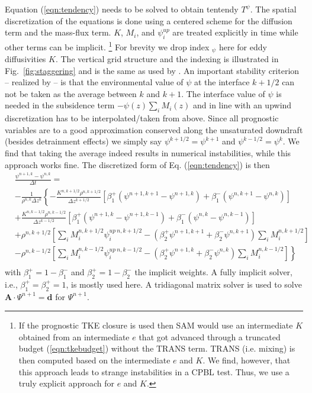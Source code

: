 \documentclass[dvipdfmx,a4paper,10pt]{article}
\begin{document}
Equation (\ref{eqn:tendency}) needs to be solved to obtain tentendy $T^{\psi}$. The spatial discretization of the equations is done using a centered scheme for the diffusion term and the mass-flux term. $K$, $M_i$, and $\psi^{up}_i$ are treated explicitly in time while other terms can be implicit. \footnote{If the prognostic TKE closure is used then SAM would use an intermediate $K$ obtained from an intermediate $e$ that got advanced through a truncated budget (\ref{eqn:tkebudget}) without the TRANS term. TRANS (i.e. mixing) is then computed based on the intermediate $e$ and $K$. We find, however, that this approach leads to strange instabilities in a CPBL test. Thus, we use a truly explicit approach for $e$ and $K$.} For brevity we drop index $_\psi$ here for eddy diffusivities $K$. The vertical grid structure and the indexing is illustrated in Fig.~\ref{fig:staggering} and is the same as used by \cite{tiedtke89}. An important stability criterion -- realized by \cite{tiedtke89} -- is that the environmental value of $\psi$ at the interface $k+1/2$ can not be taken as the average between $k$ and $k+1$. The interface value of $\psi$ is needed in the subsidence term $- \psi(z) \sum_i M_i(z)$ and in line with an upwind discretization has to be interpolated/taken from above. Since all prognostic variables are to a good approximation conserved along the unsaturated downdraft (besides detrainment effects) we simply say $\psi^{k+1/2}=\psi^{k+1}$ and  $\psi^{k-1/2}=\psi^{k}$. We find that taking the average indeed results in numerical instabilities, while this approach works fine. The discretized form of Eq. (\ref{eqn:tendency}) is then
\begin{align*}
  &\frac{\psi^{n+1,k}- \psi^{n,k} }{\Delta t} =\\
  &-\frac{1}{\rho^{n,k}\Delta z^{k}}\left\{ -\frac{K^{n,k+1/2}\rho^{n,k+1/2} }{\Delta z^{k+1/2}} [\beta_1^+(\psi^{n+1,k+1}-\psi^{n+1,k}) + \beta_1^-(\psi^{n,k+1}-\psi^{n,k})] \right. \\
    & \left.+\frac{K^{n,k-1/2}\rho^{n,k-1/2} }{\Delta z^{k-1/2}} [\beta_1^+(\psi^{n+1,k}-\psi^{n+1,k-1}) + \beta_1^-(\psi^{n,k}-\psi^{n,k-1})] \right.\\
    & \left. +\rho^{n,k+1/2}\left[\sum_i M_i^{n,k+1/2}\psi_i^{up~n,k+1/2} - (\beta_2^+\psi^{n+1,k+1}+\beta_2^-\psi^{n,k+1} )\sum_i M_i^{n,k+1/2} \right]\right.\\
    &\left.-\rho^{n,k-1/2}\left[\sum_i M_i^{n,k-1/2}\psi_i^{up~n,k-1/2} -(\beta_2^+\psi^{n+1,k}+\beta_2^-\psi^{n,k} )\sum_i M_i^{n,k-1/2} \right] \right\}\\
\end{align*}
with $\beta_1^+=1-\beta_1^-$ and $\beta_2^+=1-\beta_2^-$ the implicit weights. A fully implicit solver, i.e., $\beta_1^{+}=\beta_2^{+}=1$, is mostly used here. A tridiagonal matrix solver is used to solve $\mathbf{A}\cdot\Psi^{n+1}=\mathbf{d}$ for $\Psi^{n+1}$. 
\end{document}
